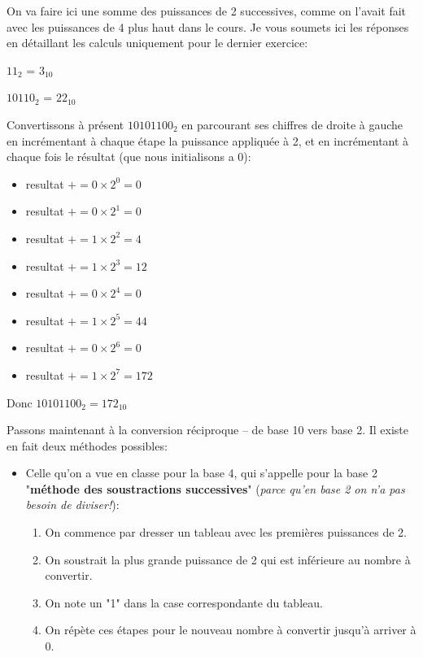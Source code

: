 \documentclass[12pt]{article}
\begin{document}
	\begin{MaReponse}
		On va faire ici une somme des puissances de 2 successives, comme on l'avait fait avec les puissances de 4 plus haut dans le cours. Je vous soumets ici les réponses en détaillant les calculs uniquement pour le dernier exercice:
		\begin{alphenum}
			\item $11_2$ = $3_{10}$
			\item $10110_2$ = $22_{10}$
		\end{alphenum}
		Convertissons à présent $10101100_2$ en parcourant ses chiffres de droite à gauche en incrémentant à chaque étape la puissance appliquée à 2, et en incrémentant à chaque fois le résultat (que nous initialisons a 0):
		\begin{itemize}
			\item resultat $+= 0\times2^0 = 0$
			\item resultat $+= 0\times2^1 = 0$
			\item resultat $+= 1\times2^2 = 4$
			\item resultat $+= 1\times2^3 = 12$
			\item resultat $+= 0\times2^4 = 0$
			\item resultat $+= 1\times2^5 = 44$
			\item resultat $+= 0\times2^6 = 0$
			\item resultat $+= 1\times2^7 = 172$\\
		\end{itemize}
		Donc $10101100_2 = 172_{10}$
	\end{MaReponse}
	
	Passons maintenant à la conversion réciproque -- de base 10 vers base 2. Il existe en fait deux méthodes possibles:
	\begin{itemize}
		\item Celle qu'on a vue en classe pour la base 4, qui s'appelle pour la base 2 "\textbf{méthode des soustractions successives}" (\textit{parce qu'en base 2 on n'a pas besoin de diviser!}):
		\begin{enumerate}
			\item On commence par dresser un tableau avec les premières puissances de 2.
			\item On soustrait la plus grande puissance de 2 qui est inférieure au nombre à convertir.
			\item On note un "1" dans la case correspondante du tableau.
			\item On répète ces étapes pour le nouveau nombre à convertir jusqu'à arriver à 0.
		\end{enumerate}
	\end{itemize}
	
\end{document}
